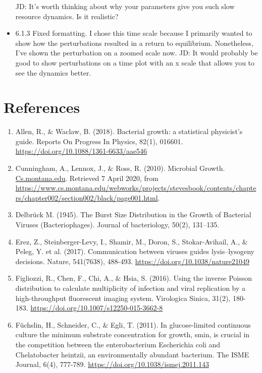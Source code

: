 \documentclass{article}
\begin{document}
\begin{itemize}
        \subitem JD: It's worth thinking about why your parameters give you such slow resource dynamics. Is it realistic?
    \item 6.1.3 Fixed formatting. I chose this time scale because I primarily wanted to show how the perturbations resulted in a return to equilibrium. Nonetheless, I've shown the perturbation on a zoomed scale now.
        \subitem JD: It would probably be good to show perturbations on a time plot with an x scale that allows you to see the dynamics better. 
\end{itemize}
 
\section{References}

\begin{enumerate}
\item	Allen, R., $\&$ Waclaw, B. (2018). Bacterial growth: a statistical physicist’s guide. Reports On Progress In Physics, 82(1), 016601.
\url{https://doi.org/10.1088/1361-6633/aae546}

\item	Cunningham, A., Lennox, J., $\&$ Ross, R. (2010). Microbial Growth. \url{Cs.montana.edu}. Retrieved 7 April 2020, from \url{https://www.cs.montana.edu/webworks/projects/stevesbook/contents/chapters/chapter002/section002/black/page001.html}.

\item	Delbrück M. (1945). The Burst Size Distribution in the Growth of Bacterial Viruses (Bacteriophages). Journal of bacteriology, 50(2), 131–135. 

\item	Erez, Z., Steinberger-Levy, I., Shamir, M., Doron, S., Stokar-Avihail, A., $\&$ Peleg, Y. et al. (2017). Communication between viruses guides lysis–lysogeny decisions. Nature, 541(7638), 488-493. \url{https://doi.org/10.1038/nature21049}

\item	Figliozzi, R., Chen, F., Chi, A., $\&$ Hsia, S. (2016). Using the inverse Poisson distribution to calculate multiplicity of infection and viral replication by a high-throughput fluorescent imaging system. Virologica Sinica, 31(2), 180-183. \url{https://doi.org/10.1007/s12250-015-3662-8} 

\item	Füchslin, H., Schneider, C., $\&$ Egli, T. (2011). In glucose-limited continuous culture the minimum substrate concentration for growth, smin, is crucial in the competition between the enterobacterium Escherichia coli and Chelatobacter heintzii, an environmentally abundant bacterium. The ISME Journal, 6(4), 777-789. \url{https://doi.org/10.1038/ismej.2011.143}


\end{enumerate}
\end{document}
